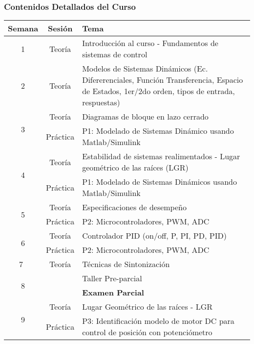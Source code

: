 \documentclass[aspectratio=169]{beamer}
\theoremstyle{definition}
\theoremstyle{plain}
\theoremstyle{remark}
\begin{document}
\begin{frame}[c]\frametitle{Contenidos Detallados del Curso}
\centering
\scriptsize
\begin{tabular}{c|c|p{11cm}}
  \textbf{Semana} & \textbf{Sesión} & \textbf{Tema} \\
  \hline
  1  & Teoría & Introducción al curso - Fundamentos de sistemas de control  \\
  \hline
  2  & Teoría & Modelos de Sistemas Dinámicos (Ec. Difererenciales, Función Transferencia, Espacio de Estados, 1er/2do orden, tipos de entrada, respuestas) \\
  \hline
  \multirow{2}{*}{3}  & Teoría     & Diagramas de bloque en lazo cerrado\\
                      & Práctica   & P1: Modelado de Sistemas Dinámico usando Matlab/Simulink \\
  \hline
  \multirow{2}{*}{4}  & Teoría     & Estabilidad de sistemas realimentados - Lugar geométrico de las raíces (LGR) \\
                      & Práctica   & P1: Modelado de Sistemas Dinámicos usando Matlab/Simulink \\
  \hline
  \multirow{2}{*}{5}  & Teoría     & Especificaciones de desempeño \\
                      & Práctica   & P2: Microcontroladores, PWM, ADC \\
  \hline
  \multirow{2}{*}{6}  & Teoría     & Controlador PID (on/off, P, PI, PD, PID) \\
                      & Práctica   & P2: Microcontroladores, PWM, ADC \\
  \hline
  7  & Teoría & Técnicas de Sintonización \\
  \hline
  \multirow{2}{*}{8}  &            & Taller Pre-parcial \\
                      &            & \textbf{Examen Parcial} \\
  \hline
  \multirow{2}{*}{9}  & Teoría     & Lugar Geométrico de las raíces - LGR \\
                      & Práctica   & P3: Identificación modelo de motor DC para control de posición con potenciómetro \\
\end{tabular}
\end{frame}
\end{document}
